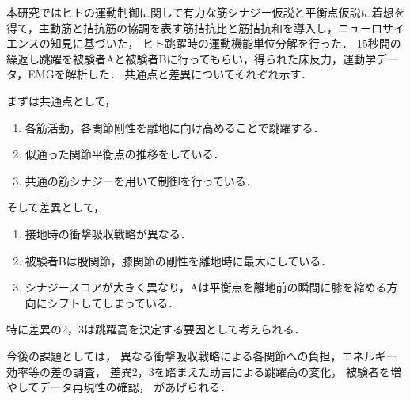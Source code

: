 本研究ではヒトの運動制御に関して有力な筋シナジー仮説と平衡点仮説に着想を得て，主動筋と拮抗筋の協調を表す筋拮抗比と筋拮抗和を導入し，ニューロサイエンスの知見に基づいた，
ヒト跳躍時の運動機能単位分解を行った．
15秒間の繰返し跳躍を被験者Aと被験者Bに行ってもらい，得られた床反力，運動学データ，EMGを解析した．
共通点と差異についてそれぞれ示す．

まずは共通点として，
\begin{enumerate}
 \item 各筋活動，各関節剛性を離地に向け高めることで跳躍する．
 \item 似通った関節平衡点の推移をしている．
 \item 共通の筋シナジーを用いて制御を行っている． 
\end{enumerate}
そして差異として，
\begin{enumerate}
 \item 接地時の衝撃吸収戦略が異なる．
 \item 被験者Bは股関節，膝関節の剛性を離地時に最大にしている．
 \item シナジースコアが大きく異なり，Aは平衡点を離地前の瞬間に膝を縮める方向にシフトしてしまっている．
\end{enumerate}

特に差異の2，3は跳躍高を決定する要因として考えられる．

今後の課題としては，
異なる衝撃吸収戦略による各関節への負担，エネルギー効率等の差の調査，
差異2，3を踏まえた助言による跳躍高の変化，
被験者を増やしてデータ再現性の確認，
があげられる．

